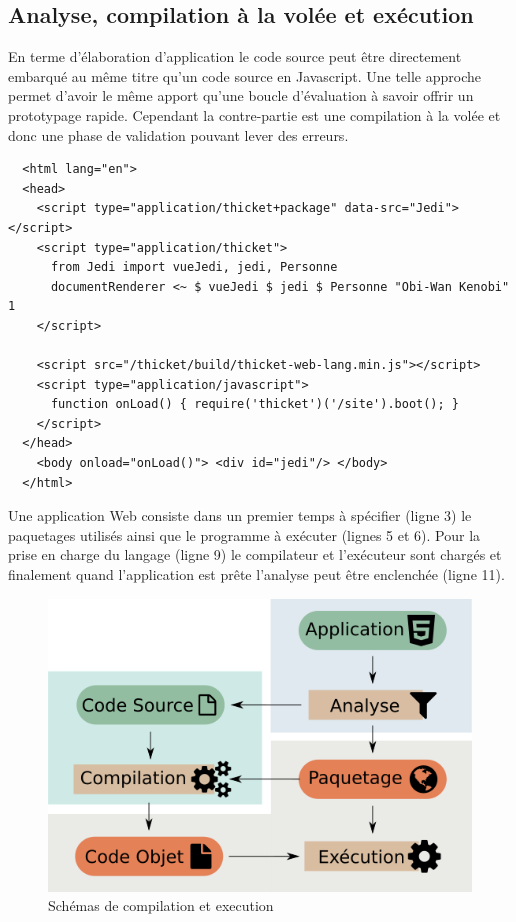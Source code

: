 \documentclass[twoside,a4paper]{article}
\begin{document}
\subsection{Analyse, compilation à la volée et exécution}

En  terme  d'élaboration  d'application   le  code  source  peut  être
directement   embarqué   au   même   titre  qu'un   code   source   en
Javascript. Une  telle approche permet  d'avoir le même  apport qu'une
boucle d'évaluation  à savoir offrir un  prototypage rapide. Cependant
la contre-partie est  une compilation à la volée et  donc une phase de
validation pouvant lever des erreurs.

\lstset{language=Html}
\begin{lstlisting}
  <html lang="en">
  <head>
    <script type="application/thicket+package" data-src="Jedi"></script>
    <script type="application/thicket">
      from Jedi import vueJedi, jedi, Personne
      documentRenderer <~ $ vueJedi $ jedi $ Personne "Obi-Wan Kenobi" 1
    </script>

    <script src="/thicket/build/thicket-web-lang.min.js"></script>    
    <script type="application/javascript">
      function onLoad() { require('thicket')('/site').boot(); }
    </script>
  </head>        
    <body onload="onLoad()"> <div id="jedi"/> </body>
  </html>
\end{lstlisting}

Une application Web consiste dans  un premier temps à spécifier (ligne
3) le paquetages utilisés ainsi que  le programme à exécuter (lignes 5
et 6).  Pour la prise en charge du langage (ligne 9) le compilateur et
l'exécuteur sont  chargés et finalement quand  l'application est prête
l'analyse peut être enclenchée (ligne 11).

\begin{figure}[h]
\centering
\includegraphics[scale=0.45]{repl} 
\caption{Schémas de compilation et execution}
\label{repl}
\end{figure}
\end{document}

